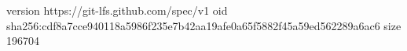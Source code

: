 version https://git-lfs.github.com/spec/v1
oid sha256:cdf8a7cce940118a5986f235e7b42aa19afe0a65f5882f45a59ed562289a6ac6
size 196704
